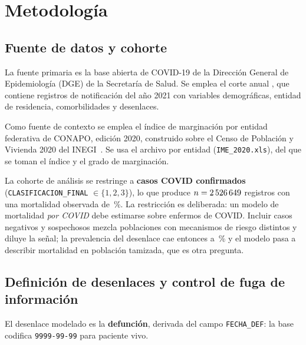 \chapter{Metodología}
\label{cap:metodologia}

\section{Fuente de datos y cohorte}

La fuente primaria es la base abierta de COVID-19 de la Dirección General de
Epidemiología (DGE) de la Secretaría de Salud. Se emplea el corte anual
\texttt{\cohorteFuente}, que contiene \nBaseCompleta{} registros de notificación
del año 2021 con variables demográficas, entidad de residencia, comorbilidades y
desenlaces.

Como fuente de contexto se emplea el índice de marginación por entidad
federativa de CONAPO, edición 2020, construido sobre el Censo de Población y
Vivienda 2020 del INEGI~\parencite{conapo2020}. Se usa el archivo por entidad
(\texttt{IME\_2020.xls}), del que se toman el índice y el grado de marginación.

La cohorte de análisis se restringe a \textbf{casos COVID confirmados}
(\texttt{CLASIFICACION\_FINAL} $\in \{1,2,3\}$), lo que produce
$n=2\,526\,649$ registros con una mortalidad observada de \cohorteTasaDef\,\%. La
restricción es deliberada: un modelo de mortalidad \emph{por COVID} debe
estimarse sobre enfermos de COVID. Incluir casos negativos y sospechosos mezcla
poblaciones con mecanismos de riesgo distintos y diluye la señal; la prevalencia
del desenlace cae entonces a \tasaDefBase\,\% y el modelo pasa a describir
mortalidad en población tamizada, que es otra pregunta.

\section{Definición de desenlaces y control de fuga de información}
\label{sec:fuga}

El desenlace modelado es la \textbf{defunción}, derivada del campo
\texttt{FECHA\_DEF}: la base codifica \texttt{9999-99-99} para paciente vivo.


